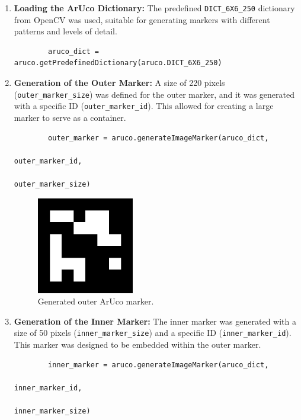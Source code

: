     \begin{enumerate}
        \item \textbf{Loading the ArUco Dictionary:} 
        The predefined \texttt{DICT\_6X6\_250} dictionary from OpenCV was used, suitable for generating markers with different patterns and levels of detail.
        \begin{verbatim}
        aruco_dict = aruco.getPredefinedDictionary(aruco.DICT_6X6_250)
        \end{verbatim}
    
        \item \textbf{Generation of the Outer Marker:} 
        A size of 220 pixels (\texttt{outer\_marker\_size}) was defined for the outer marker, and it was generated with a specific ID (\texttt{outer\_marker\_id}). This allowed for creating a large marker to serve as a container.
        \begin{verbatim}
        outer_marker = aruco.generateImageMarker(aruco_dict, 
                                                    outer_marker_id, 
                                                    outer_marker_size)
        \end{verbatim}
        \begin{center}
            \begin{figure}[H]
                \centering
                \includegraphics[width=0.4\textwidth]{pictures/aruco_marker_5.png}
                \caption{Generated outer ArUco marker.}
            \end{figure}
        \end{center}
    
        \item \textbf{Generation of the Inner Marker:} 
        The inner marker was generated with a size of 50 pixels (\texttt{inner\_marker\_size}) and a specific ID (\texttt{inner\_marker\_id}). This marker was designed to be embedded within the outer marker.
        \begin{verbatim}
        inner_marker = aruco.generateImageMarker(aruco_dict, 
                                                    inner_marker_id, 
                                                    inner_marker_size)
        \end{verbatim}


\end{enumerate}

